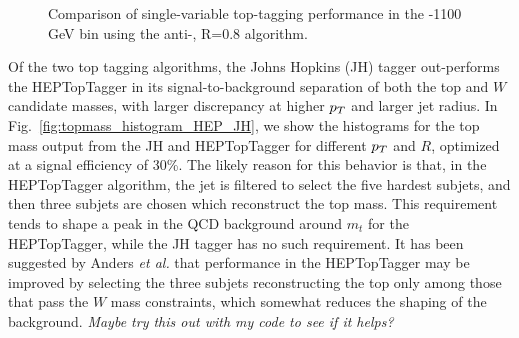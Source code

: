 \begin{figure}
\begin{center}
\caption{Comparison of single-variable top-tagging performance in the -1100 GeV bin using the anti-\kT, R=0.8 algorithm.}
\label{fig:single_variable_ROC}
\end{center}
\end{figure}

Of the two top tagging algorithms, the Johns Hopkins (JH) tagger out-performs the HEPTopTagger in its signal-to-background separation of both the top and $W$ candidate masses, with larger discrepancy at higher $p_T$ and larger jet radius. In Fig.~\ref{fig:topmass_histogram_HEP_JH}, we show the histograms for the top mass output from the JH and HEPTopTagger for different $p_T$ and $R$, optimized at a signal efficiency of 30\%. The likely reason for this behavior is that, in the HEPTopTagger algorithm, the jet is filtered to select the five hardest subjets, and then three subjets are chosen which reconstruct the top mass. This requirement tends to shape a peak in the QCD background around $m_t$ for the HEPTopTagger, while the JH tagger has no such requirement. It has been suggested by Anders \emph{et al.} \cite{Anders:2013oga} that performance in the HEPTopTagger may be improved by selecting the three subjets reconstructing the top only among those that pass the $W$ mass constraints, which somewhat reduces the shaping of the background. \emph{Maybe try this out with my code to see if it helps?}

